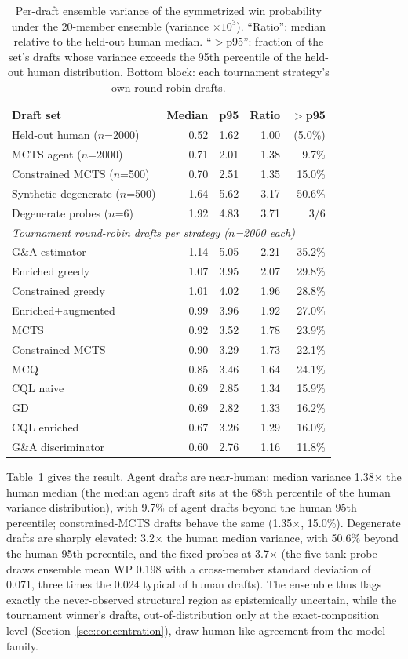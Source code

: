 \documentclass[journal]{IEEEtran}
\begin{document}
\begin{table}[t]
\centering
\caption{Per-draft ensemble variance of the symmetrized win probability under the 20-member ensemble (variance $\times 10^{3}$). ``Ratio'': median relative to the held-out human median. ``$>$p95'': fraction of the set's drafts whose variance exceeds the 95th percentile of the held-out human distribution. Bottom block: each tournament strategy's own round-robin drafts.}
\label{tab:ensvar}
\small
\setlength{\tabcolsep}{4pt}
\begin{tabular}{lrrrr}
\toprule
Draft set & Median & p95 & Ratio & $>$p95 \\
\midrule
Held-out human ($n$=2000) & 0.52 & 1.62 & 1.00 & (5.0\%) \\
MCTS agent ($n$=2000) & 0.71 & 2.01 & 1.38 & 9.7\% \\
Constrained MCTS ($n$=500) & 0.70 & 2.51 & 1.35 & 15.0\% \\
Synthetic degenerate ($n$=500) & 1.64 & 5.62 & 3.17 & 50.6\% \\
Degenerate probes ($n$=6) & 1.92 & 4.83 & 3.71 & 3/6 \\
\midrule
\multicolumn{5}{l}{\textit{Tournament round-robin drafts per strategy ($n$=2000 each)}}\\
G\&A estimator & 1.14 & 5.05 & 2.21 & 35.2\% \\
Enriched greedy & 1.07 & 3.95 & 2.07 & 29.8\% \\
Constrained greedy & 1.01 & 4.02 & 1.96 & 28.8\% \\
Enriched+augmented & 0.99 & 3.96 & 1.92 & 27.0\% \\
MCTS & 0.92 & 3.52 & 1.78 & 23.9\% \\
Constrained MCTS & 0.90 & 3.29 & 1.73 & 22.1\% \\
MCQ & 0.85 & 3.46 & 1.64 & 24.1\% \\
CQL naive & 0.69 & 2.85 & 1.34 & 15.9\% \\
GD & 0.69 & 2.82 & 1.33 & 16.2\% \\
CQL enriched & 0.67 & 3.26 & 1.29 & 16.0\% \\
G\&A discriminator & 0.60 & 2.76 & 1.16 & 11.8\% \\
\bottomrule
\end{tabular}
\end{table}

Table~\ref{tab:ensvar} gives the result. Agent drafts are near-human: median variance 1.38$\times$ the human median (the median agent draft sits at the 68th percentile of the human variance distribution), with 9.7\% of agent drafts beyond the human 95th percentile; constrained-MCTS drafts behave the same (1.35$\times$, 15.0\%). Degenerate drafts are sharply elevated: 3.2$\times$ the human median variance, with 50.6\% beyond the human 95th percentile, and the fixed probes at 3.7$\times$ (the five-tank probe draws ensemble mean WP 0.198 with a cross-member standard deviation of 0.071, three times the 0.024 typical of human drafts). The ensemble thus flags exactly the never-observed structural region as epistemically uncertain, while the tournament winner's drafts, out-of-distribution only at the exact-composition level (Section~\ref{sec:concentration}), draw human-like agreement from the model family.
\end{document}
